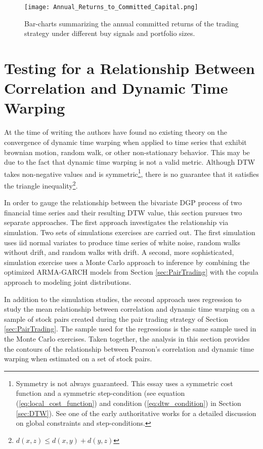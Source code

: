 \begin{landscape}
    
\begin{figure}[hp]
    \texttt{[image: Annual\_Returns\_to\_Committed\_Capital.png]}
    \caption{Bar-charts summarizing the annual committed returns of the trading strategy under different buy signals and portfolio sizes.}
    \label{fig:annual_returns_to_committed_capital_by_buy_signal}
\end{figure}

\end{landscape}


\section{Testing for a Relationship Between Correlation and Dynamic Time Warping} \label{sec:Corr_and_DTW_Relationship}

At the time of writing the authors have found no existing theory on the convergence of dynamic time warping when applied to time series that exhibit brownian motion, random walk, or other non-stationary behavior. This may be due to the fact that dynamic time warping is not a valid metric. Although DTW takes non-negative values and is symmetric\footnote{Symmetry is not always guaranteed. This essay uses a symmetric cost function and a symmetric step-condition (see equation (\ref{eq:local_cost_function}) and condition (\ref{eq:dtw_condition}) in Section \ref{sec:DTW}). See one of the early authoritative works \cite{SakoeChiba_IEEE_1978} for a detailed discussion on global constraints and step-conditions.}, there is no guarantee that it satisfies the triangle inequality\footnote{$d(x, z) \leq d(x, y) + d(y, z)$}. 

In order to gauge the relationship between the bivariate DGP process of two financial time series and their resulting DTW value, this section pursues two separate approaches. The first approach investigates the relationship via simulation. Two sets of simulations exercises are carried out. The first simulation uses iid normal variates to produce time series of white noise, random walks without drift, and random walks with drift. A second, more sophisticated, simulation exercise uses a Monte Carlo approach to inference by combining the optimized ARMA-GARCH models from Section \ref{sec:PairTrading} with the copula approach to modeling joint distributions.

In addition to the simulation studies, the second approach uses regression to study the mean relationship between correlation and dynamic time warping on a sample of stock pairs created during the pair trading strategy of Section \ref{sec:PairTrading}. The sample used for the regressions is the same sample used in the Monte Carlo exercises. Taken together, the analysis in this section provides the contours of the relationship between Pearson's correlation and dynamic time warping when estimated on a set of stock pairs. 

